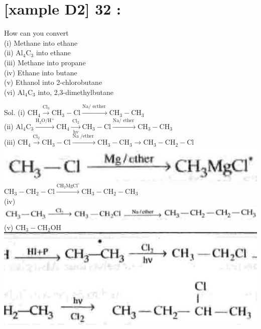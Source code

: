 \documentclass[10pt]{article}
\begin{document}
\section*{[xample D2] 32 :}
How can you convert\\
(i) Methane into ethane\\
(ii) $\mathrm{Al}_{4} \mathrm{C}_{3}$ into ethane\\
(iii) Methane into propane\\
(iv) Ethane into butane\\
(v) Ethanol into 2-chlorobutane\\
(vi) $\mathrm{Al}_{4} \mathrm{C}_{3}$ into, 2,3-dimethylbutane

Sol. (i) $\mathrm{CH}_{4} \xrightarrow{\mathrm{Cl}_{3}} \mathrm{CH}_{3}-\mathrm{Cl} \xrightarrow{\mathrm{Na} / \text { ecther }} \mathrm{CH}_{3}-\mathrm{CH}_{3}$\\
(ii) $\mathrm{Al}_{4} \mathrm{C}_{3} \xrightarrow{\mathrm{H}_{2} \mathrm{O} / \mathrm{H}^{+}} \mathrm{CH}_{4} \xrightarrow[\text { hv }]{\mathrm{Cl}_{2}} \mathrm{CH}_{3}-\mathrm{Cl} \xrightarrow{\mathrm{Na} / \text { ether }} \mathrm{CH}_{3}-\mathrm{CH}_{3}$\\
(iii) $\mathrm{CH}_{4} \xrightarrow{\mathrm{Cl}_{2}} \mathrm{CH}_{3}-\mathrm{Cl} \xrightarrow{\mathrm{Na} \text { /ether }} \mathrm{CH}_{3}-\mathrm{CH}_{3} \longrightarrow \mathrm{CH}_{3}-\mathrm{CH}_{2}-\mathrm{Cl}$\\
\includegraphics[max width=\textwidth, center]{2025_01_28_8470952b98110cec3aabg-225(4)}\\
$\mathrm{CH}_{3}-\mathrm{CH}_{2}-\mathrm{Cl} \xrightarrow{\mathrm{CH}_{2} \mathrm{MgCl}^{\circ}} \mathrm{CH}_{3}-\mathrm{CH}_{2}-\mathrm{CH}_{3}$\\
(iv)\\
\includegraphics[max width=\textwidth, center]{2025_01_28_8470952b98110cec3aabg-225(5)}\\
(v) $\mathrm{CH}_{3}-\mathrm{CH}_{2} \mathrm{OH}$\\
\includegraphics[max width=\textwidth, center]{2025_01_28_8470952b98110cec3aabg-226(6)}\\
\end{document}
